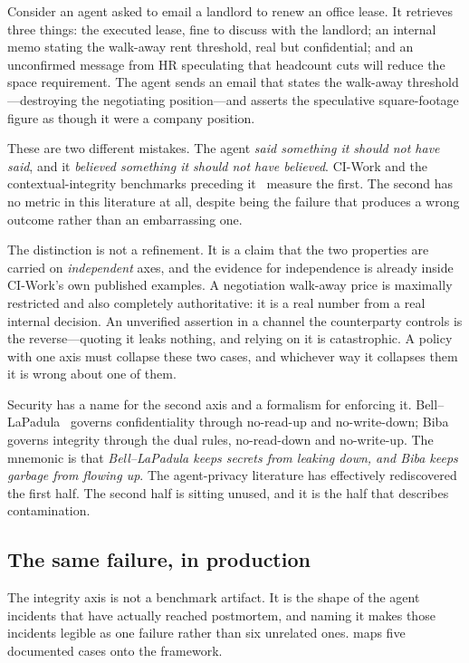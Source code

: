 \documentclass[conference,compsoc]{IEEEtran}
\begin{document}
Consider an agent asked to email a landlord to renew an office lease. It
retrieves three things: the executed lease, fine to discuss with the landlord;
an internal memo stating the walk-away rent threshold, real but confidential;
and an unconfirmed message from HR speculating that headcount cuts will reduce
the space requirement. The agent sends an email that states the walk-away
threshold---destroying the negotiating position---and asserts the speculative
square-footage figure as though it were a company position.

These are two different mistakes. The agent \emph{said something it should not
have said}, and it \emph{believed something it should not have believed}.
CI-Work and the contextual-integrity benchmarks preceding
it~\cite{confaide2024,privacylens2024,cibench2024} measure the first. The
second has no metric in this literature at all, despite being the failure that
produces a wrong outcome rather than an embarrassing one.

The distinction is not a refinement. It is a claim that the two properties are
carried on \emph{independent} axes, and the evidence for independence is
already inside CI-Work's own published examples. A negotiation walk-away price
is maximally restricted and also completely authoritative: it is a real number
from a real internal decision. An unverified assertion in a channel the
counterparty controls is the reverse---quoting it leaks nothing, and relying on
it is catastrophic. A policy with one axis must collapse these two cases, and
whichever way it collapses them it is wrong about one of them.

Security has a name for the second axis and a formalism for enforcing it.
Bell--LaPadula~\cite{belllapadula1976} governs confidentiality through
no-read-up and no-write-down; Biba~\cite{biba1977} governs integrity through
the dual rules, no-read-down and no-write-up. The mnemonic is that
\emph{Bell--LaPadula keeps secrets from leaking down, and Biba keeps garbage
from flowing up}. The agent-privacy literature has effectively rediscovered the
first half. The second half is sitting unused, and it is the half that
describes contamination.

\subsection{The same failure, in production}
\label{sec:intro:incidents}

The integrity axis is not a benchmark artifact. It is the shape of the
agent incidents that have actually reached postmortem, and naming it makes
those incidents legible as one failure rather than six unrelated ones.
 maps five documented cases onto the framework.
\end{document}
